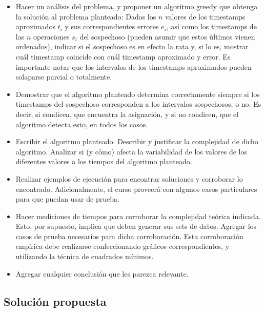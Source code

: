 \begin{itemize}
	\setlength{\leftskip}{3em} %
	\item Hacer un análisis del problema, y proponer un algoritmo greedy que obtenga la solución al problema planteado: Dados los $n$ valores de los timestamps aproximados \(t_i\) y sus correspondientes errores \(e_i\), así como los timestamps de las $n$ operaciones \(s_i\) del sospechoso (pueden asumir que estos últimos vienen ordenados), indicar si el sospechoso es en efecto la rata y, si lo es, mostrar cuál timestamp coincide con cuál timestamp aproximado y error. Es importante notar que los intervalos de los timestamps aproximados pueden solaparse parcial o totalmente.
	\item Demostrar que el algoritmo planteado determina correctamente siempre si los timestamps del sospechoso corresponden a los intervalos sospechosos, o no. Es decir, si condicen, que encuentra la asignación, y si no condicen, que el algoritmo detecta esto, en todos los casos.
	\item Escribir el algoritmo planteado. Describir y justificar la complejidad de dicho algoritmo. Analizar si (y cómo) afecta la variabilidad de los valores de los diferentes valores a los tiempos del algoritmo planteado.
	\item Realizar ejemplos de ejecución para encontrar soluciones y corroborar lo encontrado. Adicionalmente, el curso proveerá con algunos casos particulares para que puedan usar de prueba.
	\item Hacer mediciones de tiempos para corroborar la complejidad teórica indicada. Esto, por supuesto, implica que deben generar sus sets de datos. Agregar los casos de prueba necesarios para dicha corroboración. Esta corroboración empírica debe realizarse confeccionando gráficos correspondientes, y utilizando la técnica de cuadrados mínimos.
	\item Agregar cualquier conclusión que les parezca relevante.
\end{itemize}

\setlength{\leftskip}{0em}


\subsection{Solución propuesta}








